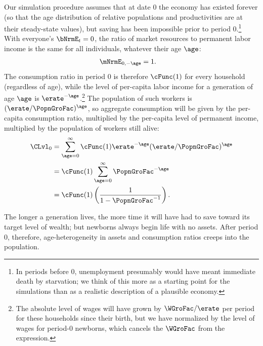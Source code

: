 \documentclass{econark}
\begin{document}
Our simulation procedure assumes that at date 0 the economy has existed forever (so 
that the age distribution of relative populations and productivities are at their steady-state values), but saving has been impossible prior to
period 0.\footnote{In periods before 0, unemployment presumably would have 
meant immediate death by starvation; we think of this more as a starting point
for the simulations than as a realistic description of a plausible economy.}
With everyone's $\bNrmE_{t}=0$, the ratio of market resources to permanent labor income is the same for all individuals, whatever their age $\age$:
\begin{equation}\begin{gathered}\begin{aligned}
  \mNrmE_{0,-\age} & =  1
.
\end{aligned}\end{gathered}\end{equation}
The consumption ratio in period 0 is therefore $\cFunc(1)$ for every
household (regardless of age), while the
level of per-capita labor income for a generation of age $\age$ is $\erate^{-\age}$.\footnote{The absolute level of wages will have
grown by $\WGroFac/\erate$ per period for these households since their birth, but we have normalized by the level of wages
for period-0 newborns, which cancels the $\WGroFac$ from the expression.}  The population of
such workers is $(\erate/\PopnGroFac)^{\age}$, so aggregate consumption will
be given by the per-capita consumption ratio, multiplied by the
per-capita level of permanent income, multiplied by the population of
workers still alive:
\begin{equation}\begin{gathered}\begin{aligned}
  \CLvl_{0} & =  \sum_{\age=0}^{\infty} \cFunc(1) \erate^{-\age} (\erate/\PopnGroFac)^{\age}
\\ & =  \cFunc(1) \sum_{\age=0}^{\infty}  \PopnGroFac^{-\age}
\\ & =  \cFunc(1) \left(\frac{1}{1-\PopnGroFac^{-1}}\right)
.
\end{aligned}\end{gathered}\end{equation}

The longer a generation lives, the more time it will have had to save toward
its target level of wealth; but newborns always begin life with no assets.  After period 0, therefore, age-heterogeneity in assets and consumption ratios creeps into the population.
\end{document}
